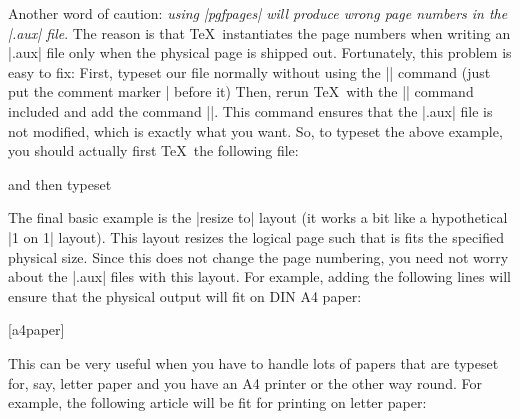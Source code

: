 Another word of caution: \emph{using |pgfpages| will produce wrong page numbers
in the |.aux| file}. The reason is that \TeX\ instantiates the page numbers
when writing an |.aux| file only when the physical page is shipped out.
Fortunately, this problem is easy to fix: First, typeset our file normally
without using the |\pgfpagesuselayout| command (just put the comment marker |%
before it) Then, rerun \TeX\ with the |\pgfpagesuselayout| command included and
add the command |\nofiles|. This command ensures that the |.aux| file is not
modified, which is exactly what you want. So, to typeset the above example, you
should actually first \TeX\ the following file:
%
%
and then typeset
%

The final basic example is the |resize to| layout (it works a bit like a
hypothetical |1 on 1| layout). This layout resizes the logical page such that
is fits the specified physical size. Since this does not change the page
numbering, you need not worry about the |.aux| files with this layout. For
example, adding the following lines will ensure that the physical output will
fit on DIN A4 paper:
%
\begin{codeexample}
\usepackage{pgfpages}
[a4paper]
\end{codeexample}

This can be very useful when you have to handle lots of papers that are typeset
for, say, letter paper and you have an A4 printer or the other way round. For
example, the following article will be fit for printing on letter paper:
%


